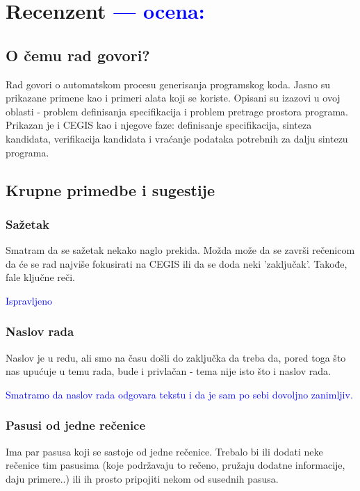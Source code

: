 \documentclass[a4paper]{report}
\newcommand{\odgovor}[1]{\textcolor{blue}{#1}}
\begin{document}
\chapter{Recenzent \odgovor{--- ocena:} }


\section{O čemu rad govori?}
Rad govori o automatskom procesu generisanja programskog koda. Jasno su prikazane primene kao i primeri alata koji se koriste. Opisani su izazovi u ovoj oblasti - problem definisanja specifikacija i problem pretrage prostora programa. Prikazan je i CEGIS kao i njegove faze: definisanje specifikacija, sinteza kandidata, verifikacija kandidata i vraćanje podataka potrebnih za dalju sintezu programa.


\section{Krupne primedbe i sugestije}


\subsection{Sažetak}

Smatram da se sažetak nekako naglo prekida. Možda može da se završi rečenicom da će se rad najviše fokusirati na CEGIS ili da se doda neki 'zaključak'. Takođe, fale ključne reči.

\odgovor{Ispravljeno}



\subsection{Naslov rada}
Naslov je u redu, ali smo na času došli do zaključka da treba da, pored toga što nas upućuje u temu rada, bude i privlačan - tema nije isto što i naslov rada.

\odgovor{Smatramo da naslov rada odgovara tekstu i da je sam po sebi dovoljno zanimljiv.}

\subsection{Pasusi od jedne rečenice}
Ima par pasusa koji se sastoje od jedne rečenice. Trebalo bi ili dodati neke rečenice tim pasusima (koje podržavaju to rečeno, pružaju dodatne informacije, daju primere..) ili ih prosto pripojiti nekom od susednih pasusa.
\end{document}
